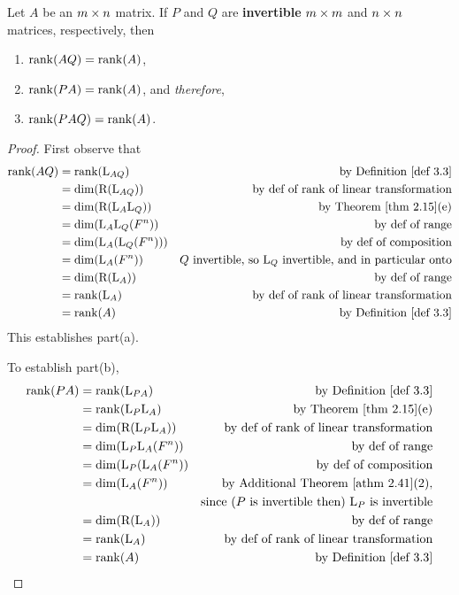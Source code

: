 \begin{theorem} \label{thm 3.4}
Let \(A\) be an \(m \times n\) matrix.
If \(P\) and \(Q\) are \textbf{invertible} \(m \times m\) and \(n \times n\) matrices, respectively,
then
\begin{enumerate}
\item \(\mathrm{rank}(AQ) = \mathrm{rank}(A)\),
\item \(\mathrm{rank}(PA) = \mathrm{rank}(A)\), and \emph{therefore},
\item \(\mathrm{rank}(PAQ) = \mathrm{rank}(A)\).
\end{enumerate}
\end{theorem}

\begin{proof}
First observe that
\begin{align*}
    \rank(AQ) & = \rank(\LMTRAN_{AQ}) & \text{by \DEF{3.3}} \\
              & = \dim(\RANGE(\LMTRAN_{AQ})) & \text{by def of rank of \LTRAN{}} \\
              & = \dim(\RANGE(\LMTRAN_A \LMTRAN_Q)) & \text{by \THM{2.15}(e)} \\
              & = \dim(\LMTRAN_A \LMTRAN_Q(F^n)) & \text{by def of range} \\
              & = \dim(\LMTRAN_A(\LMTRAN_Q(F^n))) & \text{by def of composition} \\
              & = \dim(\LMTRAN_A(F^n)) & \text{\(Q\) invertible, so \(\LMTRAN_Q\) invertible, and in particular onto} \\
              & = \dim(\RANGE(\LMTRAN_A)) & \text{by def of range} \\
              & = \rank(\LMTRAN_A) & \text{by def of rank of \LTRAN{}} \\
              & = \rank(A) & \text{by \DEF{3.3}}
\end{align*}
This establishes part(a).

To establish part(b),
\begin{align*}
    \rank(PA) & = \rank(\LMTRAN_{PA}) & \text{by \DEF{3.3}} \\
              & = \rank(\LMTRAN_P \LMTRAN_A) & \text{by \THM{2.15}(e)} \\
              & = \dim(\RANGE(\LMTRAN_P \LMTRAN_A)) & \text{by def of rank of \LTRAN{}} \\
              & = \dim(\LMTRAN_P \LMTRAN_A(F^n)) & \text{by def of range} \\
              & = \dim(\LMTRAN_P(\LMTRAN_A(F^n)) & \text{by def of composition} \\
              & = \dim(\LMTRAN_A(F^n)) & \text{by \ATHM{2.41}(2),} \\
              & & \text{since (\(P\) is invertible then) \(\LMTRAN_P\) is invertible} \\
              & = \dim(\RANGE(\LMTRAN_A)) & \text{by def of range} \\
              & = \rank(\LMTRAN_A) & \text{by def of rank of \LTRAN{}} \\
              & = \rank(A) & \text{by \DEF{3.3}}
\end{align*}


\end{proof}
